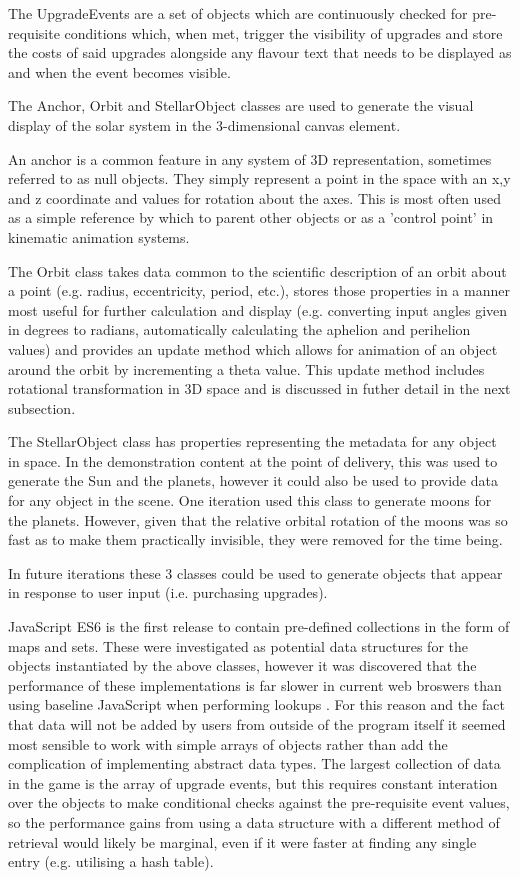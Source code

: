 \documentclass[twoside]{bhamthesis}
\begin{document}
The UpgradeEvents are a set of objects which are continuously checked for pre-requisite conditions which, when met, trigger the visibility of upgrades and store the costs of said upgrades alongside any flavour text that needs to be displayed as and when the event becomes visible.

The Anchor, Orbit and StellarObject classes are used to generate the visual display of the solar system in the 3-dimensional canvas element.

An anchor is a common feature in any system of 3D representation, sometimes referred to as null objects. They simply represent a point in the space with an x,y and z coordinate and values for rotation about the axes. This is most often used as a simple reference by which to parent other objects or as a 'control point' in kinematic animation systems.

The Orbit class takes data common to the scientific description of an orbit about a point (e.g. radius, eccentricity, period, etc.), stores those properties in a manner most useful for further calculation and display (e.g. converting input angles given in degrees to radians, automatically calculating the aphelion and perihelion values) and provides an update method which allows for animation of an object around the orbit by incrementing a theta value. This update method includes rotational transformation in 3D space and is discussed in futher detail in the next subsection.

The StellarObject class has properties representing the metadata for any object in space. In the demonstration content at the point of delivery, this was used to generate the Sun and the planets, however it could also be used to provide data for any object in the scene. One iteration used this class to generate moons for the planets. However, given that the relative orbital rotation of the moons was so fast as to make them practically invisible, they were removed for the time being.

In future iterations these 3 classes could be used to generate objects that appear in response to user input (i.e. purchasing upgrades).

JavaScript ES6 is the first release to contain pre-defined collections in the form of maps and sets. These were investigated as potential data structures for the objects instantiated by the above classes, however it was discovered that the performance of these implementations is far slower in current web broswers than using baseline JavaScript when performing lookups \cite{decker_six_2017}. For this reason and the fact that data will not be added by users from outside of the program itself it seemed most sensible to work with simple arrays of objects rather than add the complication of implementing abstract data types. The largest collection of data in the game is the array of upgrade events, but this requires constant interation over the objects to make conditional checks against the pre-requisite event values, so the performance gains from using a data structure with a different method of retrieval would likely be marginal, even if it were faster at finding any single entry (e.g. utilising a hash table).
\end{document}
